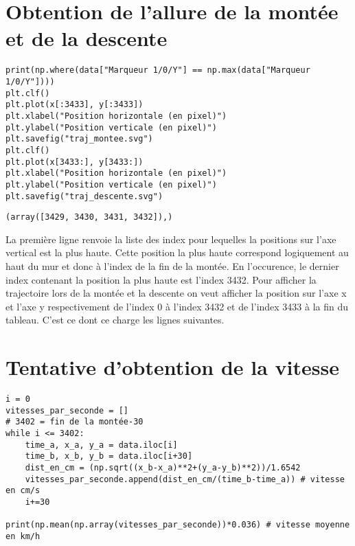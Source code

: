 \documentclass[11pt]{article}
\begin{document}
\section{Obtention de l'allure de la montée et de la descente}
\label{sec:org022ec8a}

\begin{verbatim}
print(np.where(data["Marqueur 1/0/Y"] == np.max(data["Marqueur 1/0/Y"])))
plt.clf()
plt.plot(x[:3433], y[:3433])
plt.xlabel("Position horizontale (en pixel)")
plt.ylabel("Position verticale (en pixel)")
plt.savefig("traj_montee.svg")
plt.clf()
plt.plot(x[3433:], y[3433:])
plt.xlabel("Position horizontale (en pixel)")
plt.ylabel("Position verticale (en pixel)")
plt.savefig("traj_descente.svg")
\end{verbatim}

\label{org4aaaf22}
\begin{verbatim}
(array([3429, 3430, 3431, 3432]),)
\end{verbatim}


La première ligne renvoie la liste des index pour lequelles la positions sur l'axe vertical est la plus haute. Cette position la plus haute correspond
logiquement au haut du mur et donc à l'index de la fin de la montée. En l'occurence, le dernier index contenant la position la plus haute est l'index 3432.
Pour afficher la trajectoire lors de la montée et la descente on veut afficher la position sur l'axe x et l'axe y respectivement de l'index 0 à
l'index 3432 et de l'index 3433 à la fin du tableau. C'est ce dont ce charge les lignes suivantes.

\begin{center}

\end{center}

\begin{center}

\end{center}
\section{Tentative d'obtention de la vitesse}
\label{sec:org26de182}

\begin{verbatim}
i = 0
vitesses_par_seconde = []
# 3402 = fin de la montée-30
while i <= 3402:
    time_a, x_a, y_a = data.iloc[i]
    time_b, x_b, y_b = data.iloc[i+30]
    dist_en_cm = (np.sqrt((x_b-x_a)**2+(y_a-y_b)**2))/1.6542
    vitesses_par_seconde.append(dist_en_cm/(time_b-time_a)) # vitesse en cm/s
    i+=30

print(np.mean(np.array(vitesses_par_seconde))*0.036) # vitesse moyenne en km/h
\end{verbatim}
\end{document}
